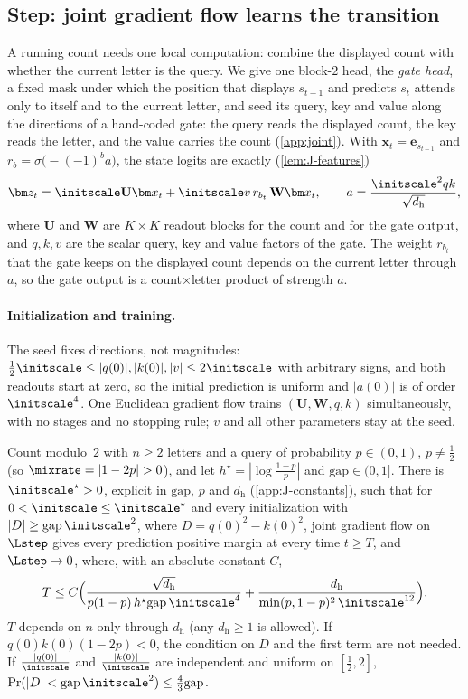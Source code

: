 \subsection{Step: joint gradient flow learns the transition}
\label{sec:step}
A running count needs one local computation: combine the displayed count with whether the current letter is the query.
We give one block-$2$ head, the \emph{gate head}, a fixed mask under which the position that displays $s_{t-1}$ and predicts $s_t$
attends only to itself and to the current letter, and seed its query, key and value along the directions of a hand-coded gate: the
query reads the displayed count, the key reads the letter, and the value carries the count (\cref{app:joint}). With
$\bm x_t=\bm e_{s_{t-1}}$ and $r_b=\sigma\bigl(-(-1)^ba\bigr)$, the state logits are exactly (\cref{lem:J-features})
\[
 \bm z_t=\initscale \mathbf U\bm x_t+\initscale v\,r_{b_t}\,\mathbf W\bm x_t,
 \qquad a=\frac{\initscale^2qk}{\sqrt{d_{\mathrm h}}},
\]
where $\mathbf U$ and $\mathbf W$ are $K\times K$ readout blocks for the count and for the gate output, and $q,k,v$ are the scalar query, key and
value factors of the gate. The weight $r_{b_t}$ that the gate keeps on the displayed count depends on the current letter through
$a$, so the gate output is a count$\times$letter product of strength $a$.

\paragraph{Initialization and training.} The seed fixes directions, not magnitudes: $\tfrac{1}{2}\initscale\le|q(0)|,|k(0)|,|v|\le2\initscale$ with arbitrary
signs, and both readouts start at zero, so the initial prediction is
uniform and $|a(0)|$ is of order $\initscale^4$. One Euclidean gradient flow trains $(\mathbf U,\mathbf W,q,k)$ simultaneously, with no stages and no
stopping rule; $v$ and all other parameters stay at the seed.

\begin{theorem}
\label{thm:joint}
Count modulo~$2$ with $n\ge2$ letters and a query of probability $p\in(0,1)$, $p\neq\tfrac{1}{2}$ (so $\mixrate=|1-2p|>0$), and let
$h^\star=|\log\tfrac{1-p}{p}|$ and $\mathrm{gap}\in(0,1]$. There is $\initscale^\star>0$, explicit in $\mathrm{gap}$, $p$ and $d_{\mathrm h}$ (\cref{app:J-constants}), such that for
$0<\initscale\le\initscale^\star$ and every initialization with $|D|\ge\mathrm{gap}\,\initscale^2$, where $D=q(0)^2-k(0)^2$, joint gradient flow on $\Lstep$ gives every prediction positive margin at
every time $t\ge T$, and $\Lstep\to0$, where, with an absolute constant $C$,
\[
 T\le C\Bigl(\frac{\sqrt{d_{\mathrm h}}}{p(1-p)\,h^\star\mathrm{gap}\,\initscale^4}+\frac{d_{\mathrm h}}{\min(p,1-p)^2\,\initscale^{12}}\Bigr).
\]
$T$ depends on $n$ only through $d_{\mathrm h}$ (any $d_{\mathrm h}\ge1$ is allowed). If $q(0)k(0)(1-2p)<0$, the condition on $D$ and the
first term are not needed. If $\frac{|q(0)|}{\initscale}$ and $\frac{|k(0)|}{\initscale}$ are independent and uniform on $[\tfrac{1}{2},2]$, $\Pr(|D|<\mathrm{gap}\,\initscale^2)\le\tfrac{4}{3}\mathrm{gap}$.
\end{theorem}

